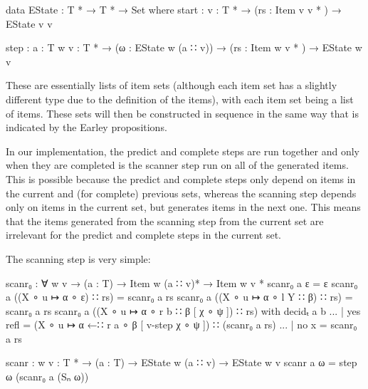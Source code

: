 		\begin{code}
			  data EState : T * → T * → Set where
			    start : {v : T *} →
			      (rs : Item v v * ) →
			      EState v v

			    step : {a : T} {w v : T *} →
			      (ω : EState w (a ∷ v)) →
			      (rs : Item w v * ) →
			      EState w v
		\end{code}

		These are essentially lists of item sets (although each item set has a
		slightly different type due to the definition of the items), with each
		item set being a list of items. These sets will then be constructed in
		sequence in the same way that is indicated by the Earley propositions.

		In our implementation, the predict and complete steps are run together
		and only when they are completed is the scanner step run on all of the
		generated items. This is possible because the predict and complete
		steps only depend on items in the current and (for complete) previous
		sets, whereas the scanning step depends only on items in the current
		set, but generates items in the next one. This means that the items
		generated from the scanning step from the current set are irrelevant
		for the predict and complete steps in the current set.

		The scanning step is very simple:

		\begin{code}
			  scanr₀ : ∀ {w v} →
			    (a : T) →
			    Item w (a ∷ v)* →
			    Item w v *
			  scanr₀ a ε = ε
			  scanr₀ a ((X ∘ u ↦ α ∘ ε) ∷ rs) = scanr₀ a rs
			  scanr₀ a ((X ∘ u ↦ α ∘ l Y ∷ β) ∷ rs) = scanr₀ a rs
			  scanr₀ a ((X ∘ u ↦ α ∘ r b ∷ β [ χ ∘ ψ ]) ∷ rs) with decidₜ a b
			  ... | yes refl = (X ∘ u ↦ α ←∷ r a ∘ β [ v-step χ ∘ ψ ]) ∷ (scanr₀ a rs)
			  ... | no x = scanr₀ a rs

			  scanr : {w v : T *} →
			    (a : T) →
			    EState w (a ∷ v) →
			    EState w v
			  scanr a ω = step ω (scanr₀ a (Sₙ ω))
		\end{code}

